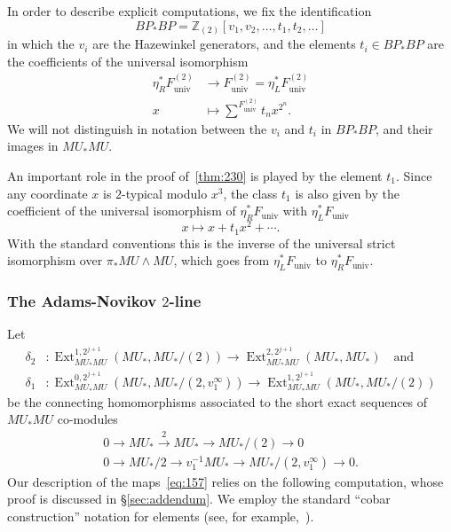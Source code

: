 \documentclass{amsart}
\theoremstyle{definition}
\theoremstyle{remark}
\newcommand{\ext}{\operatorname{Ext}}
\newcommand{\Z}{{\mathbb Z}}
\newcommand{\bpstarbp}{BP_{\ast}BP}
\newcommand{\mustarmu}{MU_{\ast}MU}
\newcommand{\mustar}{MU_{\ast}}
\newcommand{\funiv}{F_{\text{univ}}}
\begin{document}
In order to describe explicit computations, we fix the identification
\[
\bpstarbp= \Z_{(2)}[v_{1}, v_{2},\dots, t_{1},t_{2},\dots]
\]
in which the $v_{i}$ are the Hazewinkel generators, and the elements
$t_{i}\in \bpstarbp$ are the coefficients of the universal isomorphism
\begin{align*}
\eta_{R}^{\ast}\funiv^{(2)} &\to \funiv^{(2)}=
\eta_{L}^{\ast}\funiv^{(2)} \\
x &\mapsto \sum\nolimits^{\funiv^{(2)}} t_{n} x^{2^{n}}.
\end{align*}
We will not distinguish in notation between the $v_{i}$ and $t_{i}$ in
$\bpstarbp$, and their images in $\mustarmu$.

An important role in the proof of~\ref{thm:230} is played by the
element $t_{1}$.  Since any coordinate $x$ is $2$-typical modulo
$x^{3}$, the class $t_{1}$ is also given by the coefficient of the
universal isomorphism of $\eta_{R}^{\ast}{\funiv}$ with $\eta_{L}^{\ast}\funiv$
\[
x \mapsto x + t_{1}x^{2} + \cdots.
\]
With the standard conventions this is the inverse of the universal
strict isomorphism over $\pi_{\ast}MU\wedge MU$, which goes from
$\eta_{L}^{\ast}\funiv$ to $\eta_{R}^{\ast}\funiv.$

\subsubsection{The Adams-Novikov $2$-line}

Let
\begin{align*}
\delta_{2} &: \ext_{\mustarmu}^{1, 2^{j+1}}(\mustar, \mustar/(2)) \xrightarrow{}{}
\ext_{\mustarmu}^{2, 2^{j+1}}(\mustar, \mustar) \quad\text{and}\\
\delta_{1} &:\ext_{\mustarmu}^{0, 2^{j+1}}(\mustar, \mustar/(2,
v_{1}^{\infty}))\xrightarrow{} \ext_{\mustarmu}^{1,
2^{j+1}}(\mustar, \mustar/(2))
\end{align*}
be the connecting homomorphisms associated to the short exact
sequences of $\mustarmu$ co-modules
\begin{gather*}
0\to \mustar\xrightarrow{2}{} \mustar\to \mustar/(2) \to 0\\
0\to \mustar/2\to v_{1}^{-1}\mustar\to \mustar/(2,v_{1}^{\infty}) \to 0.
\end{gather*}
Our description of the maps~\eqref{eq:157} relies on the following
computation, whose proof is discussed in \S\ref{sec:addendum}.  We
employ the standard ``cobar construction'' notation for elements (see,
for example,~\cite[Definition A1.2.11]{Rav:MUnew}).
\end{document}
